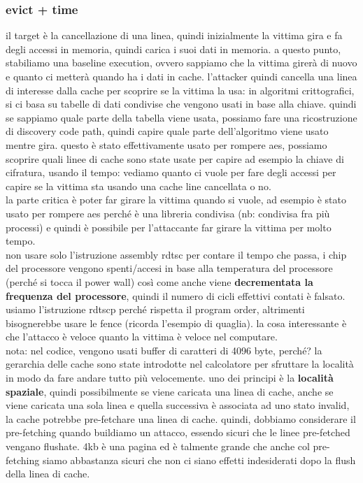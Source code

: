 \documentclass[12pt, oneside]{extbook} %
\begin{document}
\subsubsection{evict + time}
il target è la cancellazione di una linea, quindi inizialmente la vittima gira e fa degli accessi in memoria, quindi carica i suoi dati in memoria. a questo punto, stabiliamo una baseline execution, ovvero sappiamo che la vittima girerà di nuovo e quanto ci metterà quando ha i dati in cache. l'attacker quindi cancella una linea di interesse dalla cache per scoprire se la vittima la usa: in algoritmi crittografici, si ci basa su tabelle di dati condivise che vengono usati in base alla chiave. quindi se sappiamo quale parte della tabella viene usata, possiamo fare una ricostruzione di discovery code path, quindi capire quale parte dell'algoritmo viene usato mentre gira. questo è stato effettivamente usato per rompere aes, possiamo scoprire quali linee di cache sono state usate per capire ad esempio la chiave di cifratura, usando il tempo: vediamo quanto ci vuole per fare degli accessi per capire se la vittima sta usando una cache line cancellata o no.\\ la parte critica è poter far girare la vittima quando si vuole, ad esempio è stato usato per rompere aes perché è una libreria condivisa (nb: condivisa fra più processi) e quindi è possibile per l'attaccante far girare la vittima per molto tempo.\\ non usare solo l'istruzione assembly \textsf{rdtsc} per contare il tempo che passa, i chip del processore vengono spenti/accesi in base alla temperatura del processore (perché si tocca il power wall) così come anche viene \textbf{decrementata la frequenza del processore}, quindi il numero di cicli effettivi contati è falsato. usiamo l'istruzione \textsf{rdtscp} perché rispetta il program order, altrimenti bisognerebbe usare le fence (ricorda l'esempio di quaglia). la cosa interessante è che l'attacco è veloce quanto la vittima è veloce nel computare.\\ nota: nel codice, vengono usati buffer di caratteri di 4096 byte, perché? la gerarchia delle cache sono state introdotte nel calcolatore per sfruttare la località in modo da fare andare tutto più velocemente. uno dei principi è la \textbf{località spaziale}, quindi possibilmente se viene caricata una linea di cache, anche se viene caricata una sola linea e quella successiva è associata ad uno stato invalid, la cache potrebbe pre-fetchare una linea di cache. quindi, dobbiamo considerare il pre-fetching quando buildiamo un attacco, essendo sicuri che le linee pre-fetched vengano flushate. 4kb è una pagina ed è talmente grande che anche col pre-fetching siamo abbastanza sicuri che non ci siano effetti indesiderati dopo la flush della linea di cache.
\end{document}

